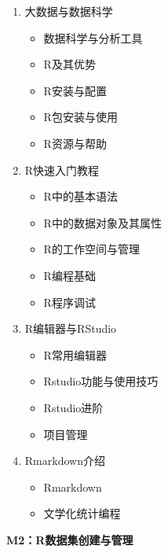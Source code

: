\documentclass[12pt,hyperref,]{ctexart}
\providecommand{\tightlist}{%
  \setlength{\itemsep}{0pt}\setlength{\parskip}{0pt}}
\begin{document}
\begin{enumerate}
\def\labelenumi{\arabic{enumi}.}
\item
  大数据与数据科学

  \begin{itemize}
  \tightlist
  \item
    数据科学与分析工具
  \item
    R及其优势
  \item
    R安装与配置
  \item
    R包安装与使用
  \item
    R资源与帮助
  \end{itemize}
\item
  R快速入门教程

  \begin{itemize}
  \tightlist
  \item
    R中的基本语法
  \item
    R中的数据对象及其属性
  \item
    R的工作空间与管理
  \item
    R编程基础
  \item
    R程序调试
  \end{itemize}
\item
  R编辑器与RStudio

  \begin{itemize}
  \tightlist
  \item
    R常用编辑器
  \item
    Rstudio功能与使用技巧
  \item
    Rstudio进阶
  \item
    项目管理
  \end{itemize}
\item
  Rmarkdown介绍

  \begin{itemize}
  \tightlist
  \item
    Rmarkdown
  \item
    文学化统计编程
  \end{itemize}
\end{enumerate}

\textbf{M2：R数据集创建与管理}
\end{document}
